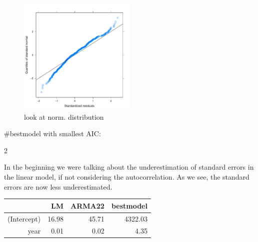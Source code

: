 \documentclass[10pt, a4paper]{article} %
\begin{document}
\begin{figure}[H]
\begin{center}
\includegraphics[width=0.5\textwidth]{FINAL_VERSION-finalgls_norm.pdf}
\caption{look at norm. distribution}
\label{finalgls_norm}
\end{center}
\end{figure}

\linebreak
#bestmodel with smallest AIC: \\
\begin{Schunk}
\begin{Soutput}
[1] 2
\end{Soutput}
\end{Schunk}


\linebreak

In the beginning we were talking about the underestimation of standard errors in the linear model, if not considering the autocorrelation. As we see, the standard errors are now less underestimated. 

\begin{table}[ht]
\centering
\begin{tabular}{rrrr}
  \hline
 & LM & ARMA22 & bestmodel \\ 
  \hline
(Intercept) & 16.98 & 45.71 & 4322.03 \\ 
  year & 0.01 & 0.02 & 4.35 \\ 
   \hline
\end{tabular}
\end{table}\linebreak
\end{document}

